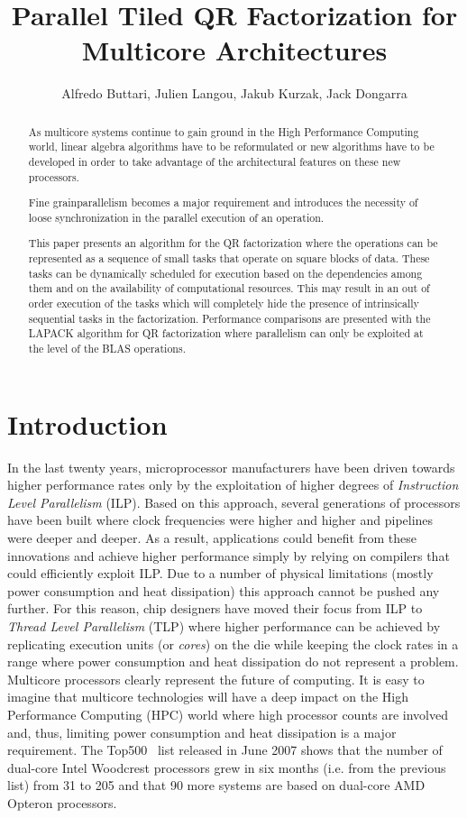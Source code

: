 \documentclass[runningheads]{llncs}
\title{Parallel Tiled QR Factorization for Multicore Architectures}
\author{Alfredo Buttari\inst{1},
  Julien Langou\inst{3},
  Jakub Kurzak\inst{1},
  Jack Dongarra\inst{1}\inst{2}
  }
\institute{Department of Electrical Engineering and Computer
Science, University Tennessee, Knoxville, Tennessee \and Computer
Science and Mathematics Division, Oak Ridge National Laboratory, Oak
Ridge, Tennessee \and Department of Mathematical Sciences,
University of Colorado at Denver and Health Sciences Center,
Colorado}
\begin{document}
\maketitle
\setcounter{page}{1}

\begin{abstract}
As multicore systems continue to gain ground in the High Performance
Computing world, linear algebra algorithms have to be reformulated
or new algorithms have to be developed in order to take advantage of
the architectural features on these new processors. 

Fine grainparallelism becomes a major requirement and introduces the necessity of loose synchronization in the parallel execution of an operation.

This paper presents an algorithm for the QR factorization where the
operations can be represented as a sequence of small tasks that
operate on square blocks of data. These tasks can be dynamically
scheduled for execution based on the dependencies among them and on
the availability of computational resources. This may result in an
out of order execution of the tasks which will completely hide the
presence of intrinsically sequential tasks in the factorization.
Performance comparisons are presented with the LAPACK algorithm for
QR factorization where parallelism can only be exploited at the
level of the BLAS operations.
\end{abstract}



\section{Introduction}

In the last twenty years, microprocessor manufacturers have been
driven towards higher performance rates only by the exploitation of
higher degrees of {\em Instruction Level Parallelism} (ILP). Based
on this approach, several generations of processors have been built
where clock frequencies were higher and higher and pipelines were
deeper and deeper. As a result, applications could benefit from
these innovations and achieve higher performance simply by relying
on compilers that could efficiently exploit ILP. Due to a number of
physical limitations (mostly power consumption and heat dissipation)
this approach cannot be pushed any further. For this reason, chip
designers have moved their focus from ILP to {\em Thread Level
  Parallelism} (TLP) where higher performance can be achieved by
replicating execution units (or {\em cores}) on the die while keeping
the clock rates in a range where power consumption and heat
dissipation do not represent a problem. Multicore processors clearly
represent the future of computing. It is easy to imagine that
multicore technologies will have a deep impact on the High Performance
Computing (HPC) world where high processor counts are involved
and, thus,  limiting power consumption and heat dissipation is a major
requirement. The Top500~\cite{top500} list released in June 2007 shows that
the number of dual-core Intel Woodcrest processors grew in six months
(i.e. from the previous list) from 31 to 205 and that 90 more systems
are based on dual-core AMD Opteron processors.
\end{document}
